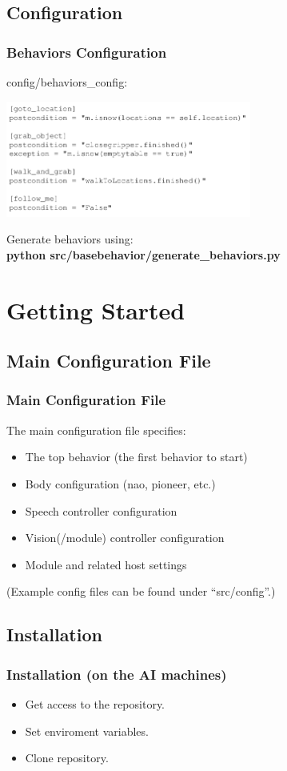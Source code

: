 \documentclass[]{beamer}
\begin{document}
\subsection{Configuration}
\begin{frame}
    \frametitle{Behaviors Configuration}
    config/behaviors\_config:
    \begin{center}
        \includegraphics[height=1.5in]{img/behaviors_config.png}
    \end{center}
    Generate behaviors using: \\ \textbf{python src/basebehavior/generate\_behaviors.py}
\end{frame}


\section{Getting Started}

\subsection{Main Configuration File}
\begin{frame}
    \frametitle{Main Configuration File}
    The main configuration file specifies:
    \begin{itemize}
        \item The top behavior (the first behavior to start)
        \item Body configuration (nao, pioneer, etc.)
        \item Speech controller configuration
        \item Vision(/module) controller configuration 
        \item Module and related host settings 
    \end{itemize}
    (Example config files can be found under ``src/config''.)
\end{frame}

\subsection{Installation}
\begin{frame}
    \frametitle{Installation (on the AI machines)}
    \begin{itemize}
        \item Get access to the repository. 
        \item Set enviroment variables.
        \item Clone repository.
    \end{itemize}
\end{frame}
\end{document}
